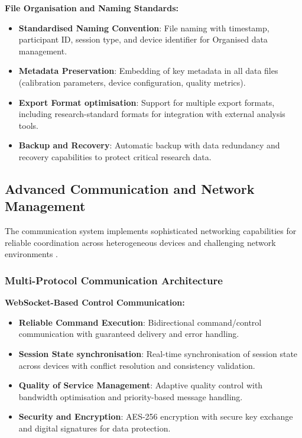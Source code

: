 \documentclass[11pt,a4paper]{report}
\begin{document}
\textbf{File Organisation and Naming Standards:}
\begin{itemize}
  \item \textbf{Standardised Naming Convention}: File naming with timestamp, participant ID, session type, and device identifier for Organised data management.
  \item \textbf{Metadata Preservation}: Embedding of key metadata in all data files (calibration parameters, device configuration, quality metrics).
  \item \textbf{Export Format optimisation}: Support for multiple export formats, including research-standard formats for integration with external analysis tools.
  \item \textbf{Backup and Recovery}: Automatic backup with data redundancy and recovery capabilities to protect critical research data.
\end{itemize}

\subsection{Advanced Communication and Network Management}

The communication system implements sophisticated networking capabilities for reliable coordination across heterogeneous devices and challenging network environments \cite{Tanenbaum2010}.

\subsubsection{Multi-Protocol Communication Architecture}

\textbf{WebSocket-Based Control Communication:}
\begin{itemize}
  \item \textbf{Reliable Command Execution}: Bidirectional command/control communication with guaranteed delivery and error handling.
  \item \textbf{Session State synchronisation}: Real-time synchronisation of session state across devices with conflict resolution and consistency validation.
  \item \textbf{Quality of Service Management}: Adaptive quality control with bandwidth optimisation and priority-based message handling.
  \item \textbf{Security and Encryption}: AES-256 encryption with secure key exchange and digital signatures for data protection.
\end{itemize}
\end{document}

